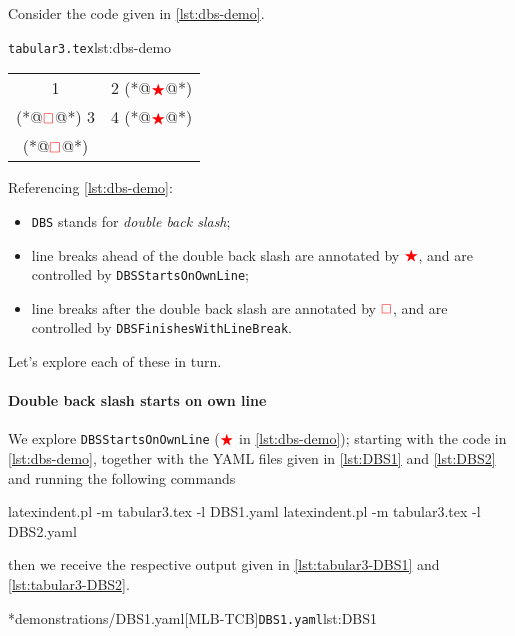 	Consider the code given in \cref{lst:dbs-demo}.
	\begin{cmhlistings}[style=tcblatex,escapeinside={(*@}{@*)}]{\texttt{tabular3.tex}}{lst:dbs-demo}
\begin{tabular}{cc}
 1 & 2 (*@$\color{red}\bigstar$@*)\\(*@$\color{red}\square$@*) 3 & 4 (*@$\color{red}\bigstar$@*)\\(*@$\color{red}\square$@*)
\end{tabular}
\end{cmhlistings}
	Referencing \cref{lst:dbs-demo}:
	\begin{itemize}
		\item \texttt{DBS} stands for \emph{double back slash};
		\item line breaks ahead of the double back slash are annotated by $\color{red}\bigstar$, and
		      are controlled by \texttt{DBSStartsOnOwnLine};
		\item line breaks after the double back slash are annotated by $\color{red}\square$,
		      and are controlled by \texttt{DBSFinishesWithLineBreak}.
	\end{itemize}

	Let's explore each of these in turn.

	\paragraph{Double back slash starts on own line}
		We explore \texttt{DBSStartsOnOwnLine} ($\color{red}\bigstar$ in \cref{lst:dbs-demo});
		starting with the code in \cref{lst:dbs-demo}, together with the YAML files given in
		\cref{lst:DBS1} and \cref{lst:DBS2} and running the following commands
		\begin{commandshell}
latexindent.pl -m tabular3.tex -l DBS1.yaml
latexindent.pl -m tabular3.tex -l DBS2.yaml
\end{commandshell}
		then we receive the respective output given in \cref{lst:tabular3-DBS1} and
		\cref{lst:tabular3-DBS2}.

		\begin{cmhtcbraster}[raster column skip=.01\linewidth]
			\cmhlistingsfromfile[style=yaml-LST]*{demonstrations/DBS1.yaml}[MLB-TCB]{\texttt{DBS1.yaml}}{lst:DBS1}
		\end{cmhtcbraster}

